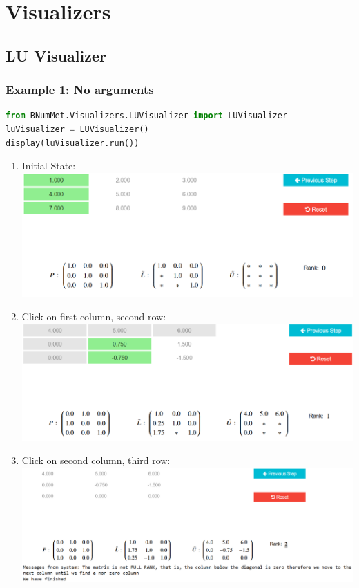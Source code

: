 \section{Visualizers}
\subsection{LU Visualizer}
\subsubsection{Example 1: No arguments}{
\begin{lstlisting}[language=Python]
from BNumMet.Visualizers.LUVisualizer import LUVisualizer
luVisualizer = LUVisualizer()
display(luVisualizer.run())
\end{lstlisting}

\begin{enumerate}
  \item Initial State:\\  
    \includegraphics[scale=0.45]{Include/Images/Thesis/Documentation/Visualizers/LUVisualizer/Example 1/Example 1 - 00 - Initial State.png}
  \item Click on first column, second row:\\
    \includegraphics[scale=0.45]{Include/Images/Thesis/Documentation/Visualizers/LUVisualizer/Example 1/Example 1 - 01 - Click on 2 row.png}
  \item Click on second column, third row:\\
    \includegraphics[scale=0.4]{Include/Images/Thesis/Documentation/Visualizers/LUVisualizer/Example 1/Example 1 - 02 - Click on 3 row.png}

\end{enumerate}}
